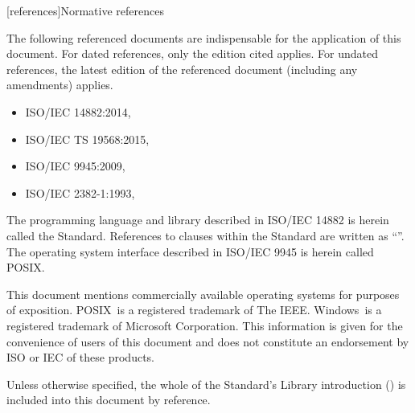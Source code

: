 
[references]{Normative references}

\pnum
The following referenced documents are indispensable for the application of this document. For dated references, only the edition cited applies. For undated references, the latest edition of the referenced document (including any amendments) applies.

\begin{itemize}
\item ISO/IEC 14882:2014, 
\item ISO/IEC TS 19568:2015, 
\item ISO/IEC 9945:2009, 
\item ISO/IEC 2382-1:1993, 
\end{itemize}

\pnum
The programming language and library described in ISO/IEC 14882 is herein called the \Cpp Standard.
References to clauses within the \Cpp Standard are written as ``''.
The operating system interface described in ISO/IEC 9945 is herein called POSIX.

\pnum
This document mentions commercially available operating systems for purposes of exposition.  POSIX\textregistered\ is a registered trademark of The IEEE. Windows\textregistered\ is a registered trademark of Microsoft Corporation. This information is given for the convenience of users of this document and does not constitute an endorsement by ISO or IEC of these products.

\pnum
Unless otherwise specified, the whole of the \Cpp Standard's Library introduction () is included into this document by reference.



